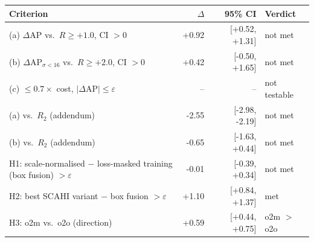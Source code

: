 \begin{tabular}{lrrl}
\toprule
Criterion & $\Delta$ & 95\% CI & Verdict \\
\midrule
(a) $\Delta$AP vs.\ $R \geq +1.0$, CI $>0$ & +0.92 & [+0.52, +1.31] & not met \\
(b) $\Delta$AP$_{\sigma<16}$ vs.\ $R \geq +2.0$, CI $>0$ & +0.42 & [-0.50, +1.65] & not met \\
(c) $\leq 0.7\times$ cost, $|\Delta$AP$|\leq\varepsilon$ & -- & -- & not testable \\
(a) vs.\ $R_2$ (addendum) & -2.55 & [-2.98, -2.19] & not met \\
(b) vs.\ $R_2$ (addendum) & -0.65 & [-1.63, +0.44] & not met \\
H1: scale-normalised $-$ loss-masked training (box fusion) $> \varepsilon$ & -0.01 & [-0.39, +0.34] & not met \\
H2: best SCAHI variant $-$ box fusion $> \varepsilon$ & +1.10 & [+0.84, +1.37] & met \\
H3: o2m vs.\ o2o (direction) & +0.59 & [+0.44, +0.75] & o2m $>$ o2o \\
\bottomrule
\end{tabular}

